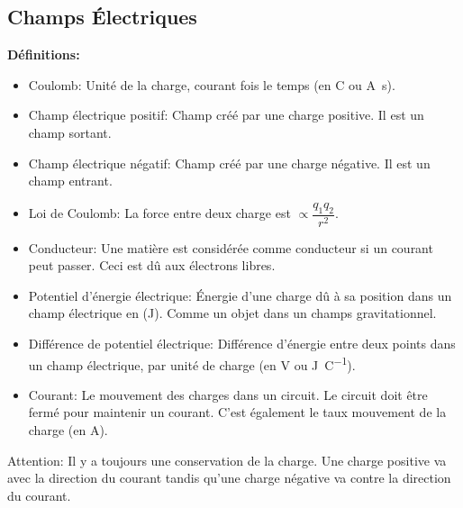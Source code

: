 \documentclass[french, a4paper, 12pt]{article}
\begin{document}
\subsection{Champs Électriques}
\textbf{Définitions:}
\begin{itemize}
\item Coulomb: Unité de la charge, courant fois le temps (en \si{\coulomb} ou \si{\ampere\second}).
\item Champ électrique positif: Champ créé par une charge positive. Il est un champ sortant.
\item Champ électrique négatif: Champ créé par une charge négative. Il est un champ entrant.
\item Loi de Coulomb: La force entre deux charge est $\propto \dfrac{q_1q_2}{r^2}$.
\item Conducteur: Une matière est considérée comme conducteur si un courant peut passer. Ceci est dû aux électrons libres.
\item Potentiel d'énergie électrique: Énergie d'une charge dû à sa position dans un champ électrique en (\si{\joule}). Comme un objet dans un champs gravitationnel.
\item Différence de potentiel électrique: Différence d'énergie entre deux points dans un champ électrique, par unité de charge (en \si{\volt} ou \si{\joule\per\coulomb}).
\item Courant: Le mouvement des charges dans un circuit. Le circuit doit être fermé pour maintenir un courant. C'est également le taux mouvement de la charge (en \si{\ampere}).
\end{itemize}
Attention: Il y a toujours une conservation de la charge. Une charge positive va avec la direction du courant tandis qu'une charge négative va contre la direction du courant.
\end{document}

